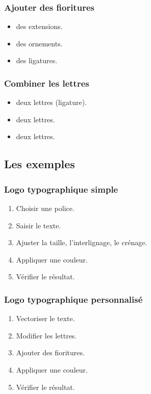\subsubsection{Ajouter des fioritures}

\begin{itemize}
    \item {} des extensions.
    \item {} des ornements.
    \item {} des ligatures.
\end{itemize}

\subsubsection{Combiner les lettres}

\begin{itemize}
    \item {} deux lettres (ligature).
    \item {} deux lettres.
    \item {} deux lettres.
\end{itemize}

\subsection{Les exemples}

\subsubsection{Logo typographique simple}

\begin{enumerate}
    \item Choisir une police.
    \item Saisir le texte.
    \item Ajuster la taille, l'interlignage, le crénage.
    \item Appliquer une couleur.
    \item Vérifier le résultat.
\end{enumerate}

\subsubsection{Logo typographique personnalisé}

\begin{enumerate}
    \item Vectoriser le texte.
    \item Modifier les lettres.
    \item Ajouter des fioritures.
    \item Appliquer une couleur.
    \item Vérifier le résultat.
\end{enumerate}

